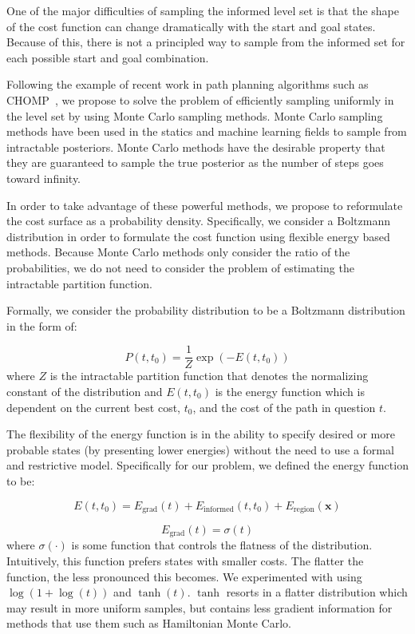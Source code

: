 \documentclass[letterpaper, 10 pt, conference]{ieeeconf}  %
\begin{document}
One of the major difficulties of sampling the informed level set is that the shape of the cost function can change dramatically with the start and goal states. Because of this, there is not a principled way to sample from the informed set for each possible start and goal combination.  

Following the example of recent work in path planning algorithms such as CHOMP~\cite{RZBS09}, we propose to solve the problem of efficiently sampling uniformly in the level set by using Monte Carlo sampling methods. Monte Carlo sampling methods have been used in the statics and machine learning fields to sample from intractable posteriors. Monte Carlo methods have the desirable property that they are guaranteed to sample the true posterior as the number of steps goes toward infinity.

In order to take advantage of these powerful methods, we propose to reformulate the cost surface as a probability density. Specifically, we consider a Boltzmann distribution in order to formulate the cost function using flexible energy based methods. Because Monte Carlo methods only consider the ratio of the probabilities, we do not need to consider the problem of estimating the intractable partition function.

Formally, we consider the probability distribution to be a Boltzmann distribution in the form of:

\begin{equation}
P\left(t,t_0\right) = \frac{1}{Z}\exp\left(-E\left(t,t_0\right)\right)
\end{equation}
where $Z$ is the intractable partition function that denotes the normalizing constant of the distribution and  $E\left(t,t_0\right)$ is the energy function which is dependent on the current best cost, $t_0$, and the cost of the path in question $t$.

The flexibility of the energy function is in the ability to specify desired or more probable states (by presenting lower energies) without the need to use a formal and restrictive model. Specifically for our problem, we defined the energy function to be:

\begin{equation}
E\left(t, t_0\right) = E_{\text{grad}}\left(t\right) + E_{\text{informed}}\left(t,t_0\right) + E_{\text{region}}\left(\mathbf{x}\right)
\end{equation}

\begin{equation}
E_{\text{grad}}\left(t\right) = \sigma\left(t\right)
\end{equation}
where $\sigma\left(\cdot\right)$ is some function that controls the flatness of the distribution.  Intuitively, this function prefers states with smaller costs. The flatter the function, the less pronounced this becomes. We experimented with using $\log\left(1 + \log\left(t\right)\right)$ and $\tanh\left(t\right)$. $\tanh$ resorts in a flatter distribution which may result in more uniform samples, but contains less gradient information for methods that use them such as Hamiltonian Monte Carlo.
\end{document}
